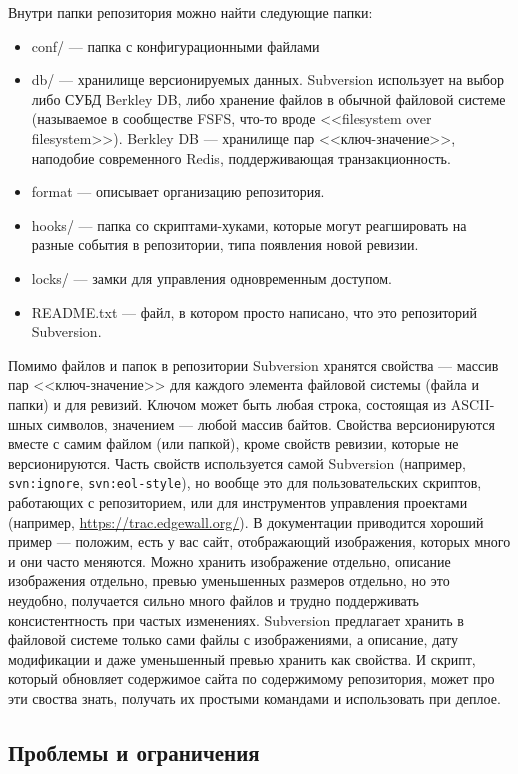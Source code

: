 \documentclass[a5paper]{article}
\begin{document}
Внутри папки репозитория можно найти следующие папки:
\begin{itemize}
	\item conf/ --- папка с конфигурационными файлами
	\item db/ --- хранилище версионируемых данных. Subversion использует на выбор либо СУБД Berkley DB, либо хранение файлов в обычной файловой системе (называемое в сообществе FSFS, что-то вроде <<filesystem over filesystem>>). Berkley DB --- хранилище пар <<ключ-значение>>, наподобие современного Redis, поддерживающая транзакционность.
	\item format --- описывает организацию репозитория.
	\item hooks/ --- папка со скриптами-хуками, которые могут реагшировать на разные события в репозитории, типа появления новой ревизии.
	\item locks/ --- замки для управления одновременным доступом.
	\item README.txt --- файл, в котором просто написано, что это репозиторий Subversion.
\end{itemize}

Помимо файлов и папок в репозитории Subversion хранятся свойства --- массив пар <<ключ-значение>> для каждого элемента файловой системы (файла и папки) и для ревизий. Ключом может быть любая строка, состоящая из ASCII-шных символов, значением --- любой массив байтов. Свойства версионируются вместе с самим файлом (или папкой), кроме свойств ревизии, которые не версионируются. Часть свойств используется самой Subversion (например, \verb|svn:ignore|, \verb|svn:eol-style|), но вообще это для пользовательских скриптов, работающих с репозиторием, или для инструментов управления проектами (например, \url{https://trac.edgewall.org/}). В документации приводится хороший пример --- положим, есть у вас сайт, отображающий изображения, которых много и они часто меняются. Можно хранить изображение отдельно, описание изображения отдельно, превью уменьшенных размеров отдельно, но это неудобно, получается сильно много файлов и трудно поддерживать консистентность при частых изменениях. Subversion предлагает хранить в файловой системе только сами файлы с изображениями, а описание, дату модификации и даже уменьшенный превью хранить как свойства. И скрипт, который обновляет содержимое сайта по содержимому репозитория, может про эти своства знать, получать их простыми командами и использовать при деплое.

\subsection{Проблемы и ограничения}
\end{document}

